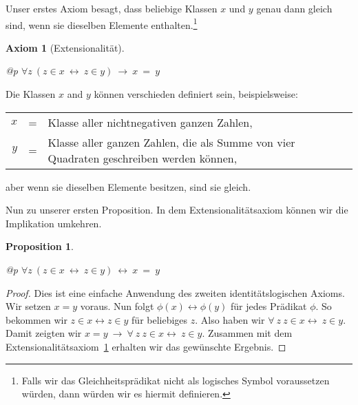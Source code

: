 \documentclass[a4paper,german,10pt,twoside]{book}
\newtheorem{prop}[thm]{Proposition}
\newtheorem{ax}{Axiom}
\theoremstyle{definition}
\theoremstyle{remark}
\begin{document}
\par
Unser erstes Axiom besagt, dass beliebige Klassen $x$ und $y$ genau dann gleich sind, wenn sie dieselben Elemente enthalten.\footnote{Falls wir das Gleichheitspr{\"a}dikat nicht als logisches Symbol voraussetzen w{\"u}rden, dann w{\"u}rden wir es hiermit definieren.}

\begin{ax}[Extensionalit{\"a}t]
\label{axiom:extensionality} \hypertarget{axiom:extensionality}{}
\mbox{}
\begin{longtable}{{@{\extracolsep{\fill}}p{\linewidth}}}
\centering $\forall z\ (z \in x\ \leftrightarrow \ z \in y)\ \rightarrow \ x \ =  \ y$
\end{longtable}

\end{ax}

Die Klassen $x$ and $y$ k{\"o}nnen verschieden definiert sein, beispielsweise:
\par
\begin{tabularx}{\linewidth}{rcX}
  $x$ & = & Klasse aller nichtnegativen ganzen Zahlen, \\
  $y$ & = & Klasse aller ganzen Zahlen, die als Summe von vier Quadraten geschreiben werden k{\"o}nnen,
\end{tabularx}
\par
aber wenn sie dieselben Elemente besitzen, sind sie gleich.


\par
Nun zu unserer ersten Proposition.
In dem Extensionalit{\"a}tsaxiom k{\"o}nnen wir die Implikation umkehren.

\begin{prop}
\label{theorem:extensonalityEquivalence} \hypertarget{theorem:extensonalityEquivalence}{}
\mbox{}
\begin{longtable}{{@{\extracolsep{\fill}}p{\linewidth}}}
\centering $\forall z\ (z \in x\ \leftrightarrow \ z \in y)\ \leftrightarrow \ x \ =  \ y$
\end{longtable}

\end{prop}
\begin{proof}
Dies ist eine einfache Anwendung des zweiten identit{\"a}tslogischen Axioms. Wir setzen $x=y$ voraus. Nun folgt $\phi(x) \leftrightarrow \phi(y)$ f{\"u}r jedes Pr{\"a}dikat $\phi$. So bekommen wir $z \in x \leftrightarrow z \in y$ f{\"u}r beliebiges $z$. Also haben wir $\forall \ z \ z  \in x \leftrightarrow \ z \in y$. Damit zeigten wir $x = y \ \rightarrow \ \forall \ z \ z  \in x \leftrightarrow \ z \in y$. Zusammen mit dem Extensionalit{\"a}tsaxiom~\ref{axiom:extensionality} erhalten wir das gew{\"u}nschte Ergebnis.
\end{proof}
\end{document}
